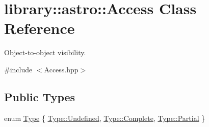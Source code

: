 \hypertarget{classlibrary_1_1astro_1_1_access}{}\section{library\+:\+:astro\+:\+:Access Class Reference}
\label{classlibrary_1_1astro_1_1_access}


Object-\/to-\/object visibility.  




{\ttfamily \#include $<$Access.\+hpp$>$}

\subsection*{Public Types}
\begin{DoxyCompactItemize}
\item 
enum \hyperlink{classlibrary_1_1astro_1_1_access_a2574b0e3f1e5ecca60471ccd04b9ff45}{Type} \{ \hyperlink{classlibrary_1_1astro_1_1_access_a2574b0e3f1e5ecca60471ccd04b9ff45aec0fc0100c4fc1ce4eea230c3dc10360}{Type\+::\+Undefined}, 
\hyperlink{classlibrary_1_1astro_1_1_access_a2574b0e3f1e5ecca60471ccd04b9ff45aae94f80b3ce82062a5dd7815daa04f9d}{Type\+::\+Complete}, 
\hyperlink{classlibrary_1_1astro_1_1_access_a2574b0e3f1e5ecca60471ccd04b9ff45a44ffd38a6dea695cbe2b34efdcc6cf27}{Type\+::\+Partial}
 \}
\end{DoxyCompactItemize}
